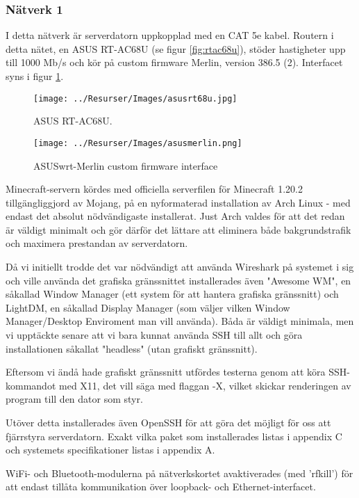\documentclass[journal,comsoc]{IEEEtran}
\begin{document}
\subsubsection{Nätverk 1} 
I detta nätverk är serverdatorn uppkopplad med en CAT 5e kabel. Routern i detta nätet, en ASUS RT-AC68U (se figur \ref{fig:rtac68u}), stöder hastigheter upp till 1000 Mb/s \cite{asus:rtac68u} och kör på custom firmware Merlin, version 386.5 (2). Interfacet syns i figur \ref{fig:asuswrt}.

\begin{figure}
  \centering
  \texttt{[image: ../Resurser/Images/asusrt68u.jpg]}
  \caption{ASUS RT-AC68U.}
  \label{fig:rtac68u}
  \vspace*{1em}
  \texttt{[image: ../Resurser/Images/asusmerlin.png]}
  \caption{ASUSwrt-Merlin custom firmware interface}
  \label{fig:asuswrt}
\end{figure}

Minecraft-servern kördes med officiella serverfilen för Minecraft 1.20.2 tillgängliggjord av Mojang, på en nyformaterad installation av Arch Linux - med endast det absolut nödvändigaste installerat. Just Arch valdes för att det redan är väldigt minimalt och gör därför det lättare att eliminera både bakgrundstrafik och maximera prestandan av serverdatorn.
 
Då vi initiellt trodde det var nödvändigt att använda Wireshark på systemet i sig och ville använda det grafiska gränssnittet installerades även "Awesome WM", en såkallad Window Manager (ett system för att hantera grafiska gränssnitt) och LightDM, en såkallad Display Manager (som väljer vilken Window Manager/Desktop Enviroment man vill använda). Båda är väldigt minimala, men vi upptäckte senare att vi bara kunnat använda SSH till allt och göra installationen såkallat "headless" (utan grafiskt gränssnitt). 

Eftersom vi ändå hade grafiskt gränssnitt utfördes testerna genom att köra SSH-kommandot med X11, det vill säga med flaggan -X, vilket skickar renderingen av program till den dator som styr. 

Utöver detta installerades även OpenSSH för att göra det möjligt för oss att fjärrstyra serverdatorn. Exakt vilka paket som installerades listas i appendix C och systemets specifikationer listas i appendix A.

WiFi- och Bluetooth-modulerna på nätverkskortet avaktiverades (med 'rfkill') för att endast tillåta kommunikation över loopback- och Ethernet-interfacet.
\end{document}
